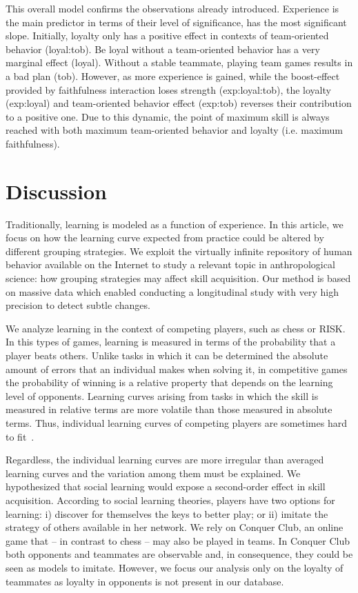 \documentclass[a4paper,10pt]{book}
\theoremstyle{definition}
\begin{document}
This overall model confirms the observations already introduced.
Experience is the main predictor in terms of their level of significance, has the most significant slope.
Initially, loyalty only has a positive effect in contexts of team-oriented behavior (loyal:tob).
Be loyal without a team-oriented behavior has a very marginal effect (loyal).
Without a stable teammate, playing team games results in a bad plan (tob).
However, as more experience is gained, while the boost-effect provided by faithfulness interaction  loses strength (exp:loyal:tob), the loyalty (exp:loyal) and team-oriented behavior effect (exp:tob) reverses their contribution to a positive one.
Due to this dynamic, the point of maximum skill is always reached with both maximum team-oriented behavior and loyalty (i.e. maximum faithfulness).

\section{Discussion}

Traditionally, learning is modeled as a function of experience. 
In this article, we focus on how the learning curve expected from practice could be altered by different grouping strategies.
We exploit the virtually infinite repository of human behavior available on the Internet to study a relevant topic in anthropological science: how grouping strategies may affect skill acquisition.
Our method is based on massive data which enabled conducting a longitudinal study with very high precision to detect subtle changes.

We analyze learning in the context of competing players, such as chess or RISK.
In this types of games, learning is measured in terms of the probability that a player beats others.
Unlike tasks in which it can be determined the absolute amount of errors that an individual makes when solving it, in competitive games the probability of winning is a relative property that depends on the learning level of opponents.
Learning curves arising from tasks in which the skill is measured in relative terms are more volatile than those measured in absolute terms.
Thus, individual learning curves of competing players are sometimes hard to fit~\cite{howard2014-learningCurvesChessPlayersATestOfPowerLawGenerality,gaschler2014-playingOffThePredictedLearningCurve}.

Regardless, the individual learning curves are more irregular than averaged learning curves and the variation among them must be explained.
We hypothesized that social learning would expose a second-order effect in skill acquisition.
According to social learning theories, players have two options for learning: i) discover for themselves the keys to better play; or ii) imitate the strategy of others available in her network.
We rely on Conquer Club, an online game that -- in contrast to chess -- may also be played in teams.
In Conquer Club both opponents and teammates are observable and, in consequence, they could be seen as models to imitate.
However, we focus our analysis only on the loyalty of teammates as loyalty in opponents is not present in our database.
\end{document}
